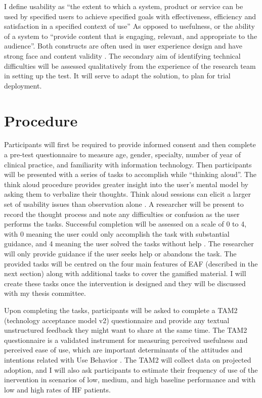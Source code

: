 I define usability as ``the extent to which a system, product or service can be used by specified users to achieve specified goals with effectiveness, efficiency and satisfaction in a specified context of use'' \cite{international1998iso} As opposed to usefulness, or the ability of a system to ``provide content that is engaging, relevant, and appropriate to the audience''. Both constructs are often used in user experience design and have strong face and content validity \cite{united2006research}. The secondary aim of identifying technical difficulties will be assessed qualitatively from the experience of the research team in setting up the test. It will serve to adapt the solution, to plan for trial deployment.

\section{Procedure}
Participants will first be required to provide informed consent and then complete a pre-test questionnaire to measure age, gender, specialty, number of year of clinical practice, and familiarity with information technology. Then participants will be presented with a series of tasks to accomplish while ``thinking aloud''. The think aloud procedure provides greater insight into the user's mental model by asking them to verbalize their thoughts. Think aloud sessions can elicit a larger set of usability issues than observation alone \cite{ericsson1980verbal}. A researcher will be present to record the thought process and note any difficulties or confusion as the user performs the tasks. Successful completion will be assessed on a scale of 0 to 4, with 0 meaning the user could only accomplish the task with substantial guidance, and 4 meaning the user solved the tasks without help \cite{rubin2008handbook}. The researcher will only provide guidance if the user seeks help or abandons the task. The provided tasks will be centred on the four main features of \gls{EAF} (described in the next section) along with additional tasks to cover the gamified material. I will create these tasks once the intervention is designed and they will be discussed with my thesis committee.

Upon completing the tasks, participants will be asked to complete a TAM2 (technology acceptance model v2) questionnaire and provide any textual unstructured feedback they might want to share at the same time. The TAM2 questionnaire is a validated instrument for measuring perceived usefulness and perceived ease of use, which are important determinants of the attitudes and intentions related with Use Behavior \cite{venkatesh2000theoretical}. The TAM2 will collect data on projected adoption, and I will also ask participants to estimate their frequency of use of the inervention in scenarios of low, medium, and high baseline performance and with low and high rates of HF patients.

